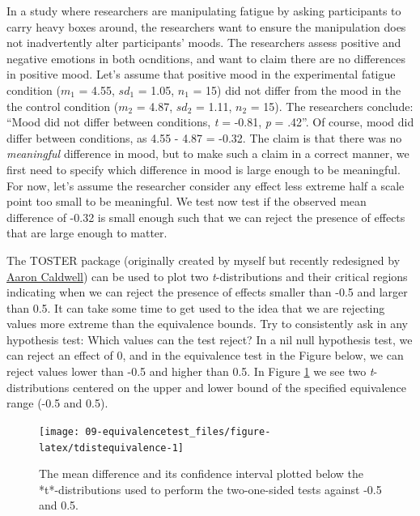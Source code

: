 \documentclass[
  oneside]{book}
\begin{document}
In a study where researchers are manipulating fatigue by asking participants to carry heavy boxes around, the researchers want to ensure the manipulation does not inadvertently alter participants' moods. The researchers assess positive and negative emotions in both ocnditions, and want to claim there are no differences in positive mood. Let's assume that positive mood in the experimental fatigue condition (\(m_1\) = 4.55, \(sd_1\) = 1.05, \(n_1\) = 15) did not differ from the mood in the the control condition (\(m_2\) = 4.87, \(sd_2\) = 1.11, \(n_2\) = 15). The researchers conclude: ``Mood did not differ between conditions, \emph{t} = -0.81, \emph{p} = .42''. Of course, mood did differ between conditions, as 4.55 - 4.87 = -0.32. The claim is that there was no \emph{meaningful} difference in mood, but to make such a claim in a correct manner, we first need to specify which difference in mood is large enough to be meaningful. For now, let's assume the researcher consider any effect less extreme half a scale point too small to be meaningful. We test now test if the observed mean difference of -0.32 is small enough such that we can reject the presence of effects that are large enough to matter.

The TOSTER package (originally created by myself but recently redesigned by \href{https://aaroncaldwell.us/}{Aaron Caldwell}) can be used to plot two \emph{t}-distributions and their critical regions indicating when we can reject the presence of effects smaller than -0.5 and larger than 0.5. It can take some time to get used to the idea that we are rejecting values more extreme than the equivalence bounds. Try to consistently ask in any hypothesis test: Which values can the test reject? In a nil null hypothesis test, we can reject an effect of 0, and in the equivalence test in the Figure below, we can reject values lower than -0.5 and higher than 0.5. In Figure \ref{fig:tdistequivalence} we see two \emph{t}-distributions centered on the upper and lower bound of the specified equivalence range (-0.5 and 0.5).

\begin{figure}

{\centering \texttt{[image: 09-equivalencetest\_files/figure-latex/tdistequivalence-1]} 

}

\caption{The mean difference and its confidence interval plotted below the *t*-distributions used to perform the two-one-sided tests against -0.5 and 0.5.}\label{fig:tdistequivalence}
\end{figure}
\end{document}
